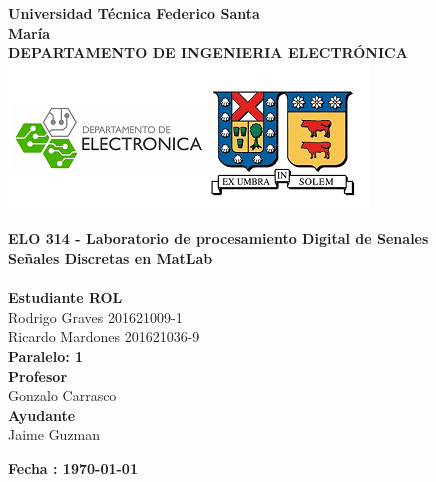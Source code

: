 \documentclass[12pt,a4paper]{article} %
\begin{document}
\begin{titlepage}
\begin{center}
\textbf{\LARGE Universidad Técnica Federico Santa}\\[0.25cm]
\textbf{\LARGE María}\\[0.5cm]
\textbf{\large DEPARTAMENTO DE INGENIERIA ELECTRÓNICA}\\[0.2cm]
\vspace{20pt}
\includegraphics{logousm.png}\\[1cm]

\par
\vspace{15pt}
\textbf{\Large ELO 314 - Laboratorio de procesamiento Digital de Senales}\\
\vspace{15pt}
\myrule[1pt][7pt]
\textbf{\LARGE  Señales Discretas en MatLab}\\[0.25cm]
\vspace{15pt}
\textbf{\large  }\\
\myrule[1pt][7pt]
\vspace{55pt}
\textbf{\large Estudiante \hspace{75pt} ROL}\\
    \hspace{0pt}Rodrigo Graves\hspace{75pt} 201621009-1 \\
     Ricardo Mardones      \hspace{60pt} 201621036-9 \\
   


\vspace{30pt}
\textbf{\large Paralelo: \hspace{30pt} 1}\\

\vspace{35pt}
\textbf {\large Profesor}\\[0.2cm]
\Large { Gonzalo Carrasco}\\[0.1cm]
\textbf {\large Ayudante}\\[0.2cm]
\Large {Jaime Guzman}\\[0.1cm]
\end{center}

\par
\vfill
\begin{center}
\textbf{Fecha : \today}\\
\end{center}

\end{titlepage}
\end{document}
